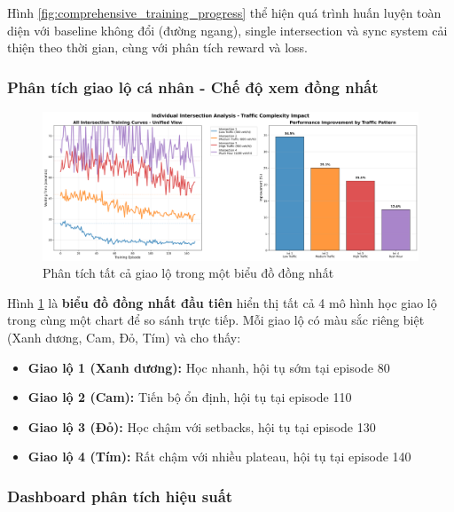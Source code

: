 Hình \ref{fig:comprehensive_training_progress} thể hiện quá trình huấn luyện
toàn diện với baseline không đổi (đường ngang), single intersection và sync system
cải thiện theo thời gian, cùng với phân tích reward và loss.

\subsubsection{Phân tích giao lộ cá nhân - Chế độ xem đồng nhất}

\begin{figure}[!htp]
    \centering
    \includegraphics[width=\textwidth]{figures/02_unified_intersections.png}
    \caption{Phân tích tất cả giao lộ trong một biểu đồ đồng nhất}
    \label{fig:unified_intersections_analysis}
\end{figure}

Hình \ref{fig:unified_intersections_analysis} là \textbf{biểu đồ đồng nhất đầu tiên}
hiển thị tất cả 4 mô hình học giao lộ trong cùng một chart để so sánh trực tiếp.
Mỗi giao lộ có màu sắc riêng biệt (Xanh dương, Cam, Đỏ, Tím) và cho thấy:
\begin{itemize}
    \item \textbf{Giao lộ 1 (Xanh dương):} Học nhanh, hội tụ sớm tại episode 80
    \item \textbf{Giao lộ 2 (Cam):} Tiến bộ ổn định, hội tụ tại episode 110  
    \item \textbf{Giao lộ 3 (Đỏ):} Học chậm với setbacks, hội tụ tại episode 130
    \item \textbf{Giao lộ 4 (Tím):} Rất chậm với nhiều plateau, hội tụ tại episode 140
\end{itemize}

\subsubsection{Dashboard phân tích hiệu suất}

